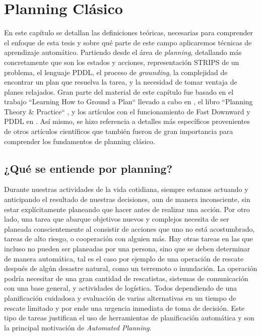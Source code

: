 \chapter{Planning Clásico}
\label{ch:lit_planning}

En este capítulo se detallan las definiciones teóricas, necesarias para
comprender el enfoque de esta tesis y sobre qué parte de este campo aplicaremos
técnicas de aprendizaje automático. Partiendo desde el área de \emph{planning},
detallando más concretamente que son los estados y acciones, representación
STRIPS de un problema, el lenguaje PDDL, el proceso de \emph{grounding}, la
complejidad de encontrar un plan que resuelva la tarea, y la necesidad de tomar
ventaja de planes relajados. Gran parte del material de este capítulo fue basado
en el trabajo ``Learning How to Ground a Plan`` llevado a cabo en
\citep{Gnad_Torralba_Dominguez_Areces_Bustos_2019}, el libro ``Planning Theory
\& Practice`` \citep{Nau-Ghallab-Malik-Traverso-2004}, y los artículos con el
funcionamiento de Fast Downward y PDDL en \citep{Helmert-2011, McDermott1998}.
Así mismo, se hizo referencia a detalles más específicos provenientes de otros
artículos científicos que también fueron de gran importancia para comprender los
fundamentos de planning clásico.

\section{¿Qué se entiende por planning?}

Durante nuestras actividades de la vida cotidiana, siempre estamos actuando y
anticipando el resultado de nuestras decisiones, aun de manera inconsciente, sin
estar explícitamente planeando que hacer antes de realizar una acción. Por otro
lado, una tarea que abarque objetivos nuevos y complejos necesita de ser
planeada conscientemente al consistir de acciones que uno no está acostumbrado,
tareas de alto riesgo, o cooperación con alguien más. Hay otras tareas en las
que incluso no pueden ser planeadas por una persona, sino que se deben
determinar de manera automática, tal es el caso por ejemplo de una operación de
rescate después de algún desastre natural, como un terremoto o inundación. La
operación podría necesitar de una gran cantidad de rescatistas, sistemas de
comunicación con una base general, y actividades de logística. Todos dependiendo
de una planificación cuidadosa y evaluación de varias alternativas en un tiempo
de rescate limitado y por ende una urgencia inmediata de toma de decisión. Este
tipo de tareas justifican el uso de herramientas de planificación automática y
son la principal motivación de \emph{Automated Planning}.

